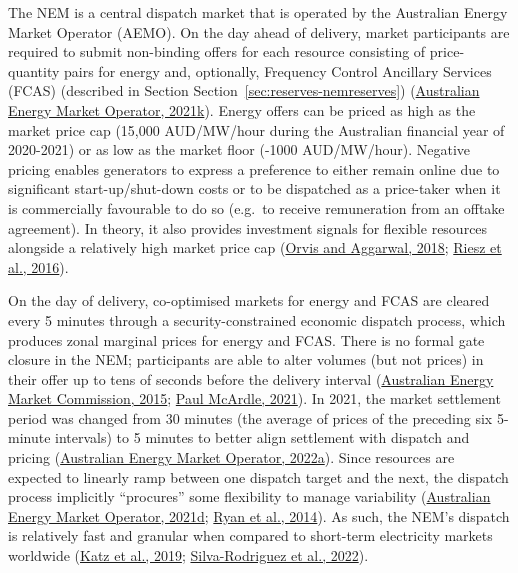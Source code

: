 \documentclass[12pt,a4paper,]{report}
\begin{document}
The NEM is a central dispatch market that is operated by the Australian
Energy Market Operator (AEMO). On the day ahead of delivery, market
participants are required to submit non-binding offers for each resource
consisting of price-quantity pairs for energy and, optionally, Frequency
Control Ancillary Services (FCAS) (described in Section
Section~\ref{sec:reserves-nemreserves})
(\protect\hyperlink{ref-australianenergymarketoperatorPredispatchOperatingProcedure2021}{Australian
Energy Market Operator, 2021k}). Energy offers can be priced as high as
the market price cap (15,000 AUD/MW/hour during the Australian financial
year of 2020-2021) or as low as the market floor (-1000 AUD/MW/hour).
Negative pricing enables generators to express a preference to either
remain online due to significant start-up/shut-down costs or to be
dispatched as a price-taker when it is commercially favourable to do so
(e.g.~to receive remuneration from an offtake agreement). In theory, it
also provides investment signals for flexible resources alongside a
relatively high market price cap
(\protect\hyperlink{ref-orvisRefiningCompetitiveElectricity2018}{Orvis
and Aggarwal, 2018};
\protect\hyperlink{ref-rieszAssessingViabilityEnergyonly2016}{Riesz et
al., 2016}).

On the day of delivery, co-optimised markets for energy and FCAS are
cleared every 5 minutes through a security-constrained economic dispatch
process, which produces zonal marginal prices for energy and FCAS. There
is no formal gate closure in the NEM; participants are able to alter
volumes (but not prices) in their offer up to tens of seconds before the
delivery interval
(\protect\hyperlink{ref-australianenergymarketcommissionBiddingGoodFaith2015}{Australian
Energy Market Commission, 2015};
\protect\hyperlink{ref-paulmcardleTwoRecentImprovements2021}{Paul
McArdle, 2021}). In 2021, the market settlement period was changed from
30 minutes (the average of prices of the preceding six 5-minute
intervals) to 5 minutes to better align settlement with dispatch and
pricing
(\protect\hyperlink{ref-australianenergymarketoperator5MSCommencement2022}{Australian
Energy Market Operator, 2022a}). Since resources are expected to
linearly ramp between one dispatch target and the next, the dispatch
process implicitly ``procures'' some flexibility to manage variability
(\protect\hyperlink{ref-australianenergymarketoperatorDispatchStandardOperating2019}{Australian
Energy Market Operator, 2021d};
\protect\hyperlink{ref-ryanVariableGenerationReserves2014}{Ryan et al.,
2014}). As such, the NEM's dispatch is relatively fast and granular when
compared to short-term electricity markets worldwide
(\protect\hyperlink{ref-katzOpeningMarketsDesigning2019}{Katz et al.,
2019};
\protect\hyperlink{ref-silva-rodriguezShortTermWholesale2022}{Silva-Rodriguez
et al., 2022}).
\end{document}
